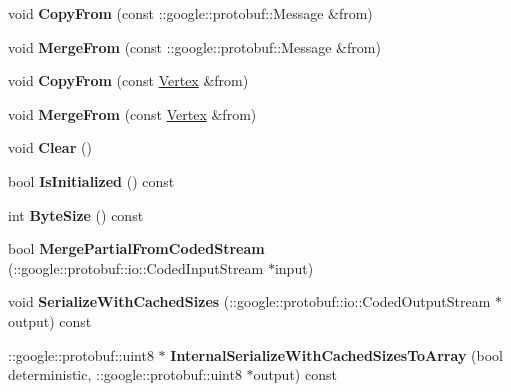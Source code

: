 \begin{DoxyCompactItemize}
void {\bfseries Copy\+From} (const \+::google\+::protobuf\+::\+Message \&from)
\item 
\hypertarget{classstruct_definitions_1_1_vertex_a7999c98028ffbb6a6e0c95ea211e8637}{}\label{classstruct_definitions_1_1_vertex_a7999c98028ffbb6a6e0c95ea211e8637} 
void {\bfseries Merge\+From} (const \+::google\+::protobuf\+::\+Message \&from)
\item 
\hypertarget{classstruct_definitions_1_1_vertex_a75eb86ffc6db18402aad9c32a4e9e235}{}\label{classstruct_definitions_1_1_vertex_a75eb86ffc6db18402aad9c32a4e9e235} 
void {\bfseries Copy\+From} (const \hyperlink{classstruct_definitions_1_1_vertex}{Vertex} \&from)
\item 
\hypertarget{classstruct_definitions_1_1_vertex_a325b0fd65acd8600c32efa09956d8e30}{}\label{classstruct_definitions_1_1_vertex_a325b0fd65acd8600c32efa09956d8e30} 
void {\bfseries Merge\+From} (const \hyperlink{classstruct_definitions_1_1_vertex}{Vertex} \&from)
\item 
\hypertarget{classstruct_definitions_1_1_vertex_a611fac4f8d5c575c4f942a37e36cd67c}{}\label{classstruct_definitions_1_1_vertex_a611fac4f8d5c575c4f942a37e36cd67c} 
void {\bfseries Clear} ()
\item 
\hypertarget{classstruct_definitions_1_1_vertex_a23040bd94a6fdf8ebe8905ffe82f923d}{}\label{classstruct_definitions_1_1_vertex_a23040bd94a6fdf8ebe8905ffe82f923d} 
bool {\bfseries Is\+Initialized} () const
\item 
\hypertarget{classstruct_definitions_1_1_vertex_ad74c82a1f63e2ba74f60ce997246f21d}{}\label{classstruct_definitions_1_1_vertex_ad74c82a1f63e2ba74f60ce997246f21d} 
int {\bfseries Byte\+Size} () const
\item 
\hypertarget{classstruct_definitions_1_1_vertex_a54f9c13a17ba9083354d627a93516b46}{}\label{classstruct_definitions_1_1_vertex_a54f9c13a17ba9083354d627a93516b46} 
bool {\bfseries Merge\+Partial\+From\+Coded\+Stream} (\+::google\+::protobuf\+::io\+::\+Coded\+Input\+Stream $\ast$input)
\item 
\hypertarget{classstruct_definitions_1_1_vertex_a1cd7384ec3487a05155a60564cfc33bb}{}\label{classstruct_definitions_1_1_vertex_a1cd7384ec3487a05155a60564cfc33bb} 
void {\bfseries Serialize\+With\+Cached\+Sizes} (\+::google\+::protobuf\+::io\+::\+Coded\+Output\+Stream $\ast$output) const
\item 
\hypertarget{classstruct_definitions_1_1_vertex_a35d08bcc7c95fa812ccb67bc0000508d}{}\label{classstruct_definitions_1_1_vertex_a35d08bcc7c95fa812ccb67bc0000508d} 
\+::google\+::protobuf\+::uint8 $\ast$ {\bfseries Internal\+Serialize\+With\+Cached\+Sizes\+To\+Array} (bool deterministic, \+::google\+::protobuf\+::uint8 $\ast$output) const

\end{DoxyCompactItemize}
